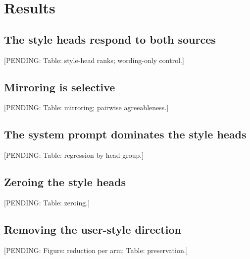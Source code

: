 \documentclass[11pt]{article}
\newcommand{\pending}[1]{\par\noindent\textcolor{orange!80!black}{\small[PENDING: #1]}\par\medskip}
\begin{document}
\section{Results}
\subsection{The style heads respond to both sources}
\pending{Table: style-head ranks; wording-only control.}
\subsection{Mirroring is selective}
\pending{Table: mirroring; pairwise agreeableness.}
\subsection{The system prompt dominates the style heads}
\pending{Table: regression by head group.}
\subsection{Zeroing the style heads}
\pending{Table: zeroing.}
\subsection{Removing the user-style direction}
\pending{Figure: reduction per arm; Table: preservation.}
\end{document}
